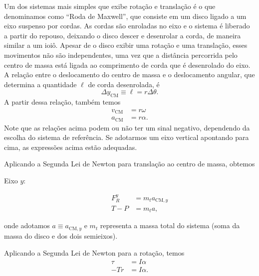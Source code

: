 Um dos sistemas mais simples que exibe rotação e translação é o que denominamos como ``Roda de Maxwell'', que consiste em um disco ligado a um eixo suspenso por cordas. As cordas são enroladas no eixo e o sistema é liberado a partir do repouso, deixando o disco descer e desenrolar a corda, de maneira similar a um ioiô. Apesar de o disco exibir uma rotação e uma translação, esses movimentos não são independentes, uma vez que a distância percorrida pelo centro de massa está ligada ao comprimento de corda que é desenrolado do eixo. A relação entre o deslocamento do centro de massa e o deslocamento angular, que determina a quantidade $\ell$ de corda desenrolada, é
\begin{equation}
    \Delta y_{\text{CM}} \equiv \ell = r \Delta \theta.
\end{equation}
%
A partir dessa relação, também temos
\begin{align}
    v_{\text{CM}} &= r \omega \\
    a_{\text{CM}} &= r \alpha.
\end{align}
%
Note que as relações acima podem ou não ter um sinal negativo, dependendo da escolha do sistema de referência. Se adotarmos um eixo vertical apontando para cima, as expressões acima estão adequadas.

Aplicando a Segunda Lei de Newton para translação ao centro de massa, obtemos
\begin{description}
\item[Eixo $y$:]
\begin{align}
    F_R^y &= m_t a_{\text{CM}, y} \\
    T - P &= m_t a,
\end{align}
\end{description}
%
onde adotamos $a \equiv a_{\text{CM}, y}$ e $m_t$ representa a massa total do sistema (soma da massa do disco e dos dois semieixos).

Aplicando a Segunda Lei de Newton para a rotação, temos
\begin{align}
    \tau &= I\alpha \\
    -Tr &= I\alpha.
\end{align}

